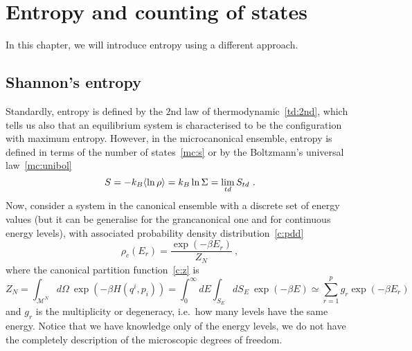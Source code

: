 \chapter{Entropy and counting of states}

    In this chapter, we will introduce entropy using a different approach. 
    
\section{Shannon's entropy} 
    
    Standardly, entropy is defined by the $2$nd law of thermodynamic~\eqref{td:2nd}, which tells us also that an equilibrium system is characterised to be the configuration with maximum entropy. However, in the microcanonical ensemble, entropy is defined in terms of the number of states~\eqref{mc:s} or by the Boltzmann's universal law~\eqref{mc:unibol}
    \begin{equation*}
        S = - k_B \langle\ln \rho\rangle = k_B \ln \Sigma = \lim_{td} S_{td} ~.
    \end{equation*}
    Now, consider a system in the canonical ensemble with a discrete set of energy values (but it can be generalise for the grancanonical one and for continuous energy levels), with associated probability density distribution~\eqref{c:pdd}
    \begin{equation*}
        \rho_c (E_r) = \frac{\exp(-\beta E_r)}{Z_N} ~,
    \end{equation*}
    where the canonical partition function~\eqref{c:z} is 
    \begin{equation*}
        Z_N = \int_{\mathcal M^N} d\Omega~ \exp(-\beta H(q^i, p_i)) = \int_0^\infty dE \int_{S_E} dS_E ~ \exp(-\beta E) \simeq \sum_{r=1}^{p} g_r \exp(-\beta E_r)
    \end{equation*}
    and $g_r$ is the multiplicity or degeneracy, i.e.~how many levels have the same energy. Notice that we have knowledge only of the energy levels, we do not have the completely description of the microscopic degrees of freedom.

